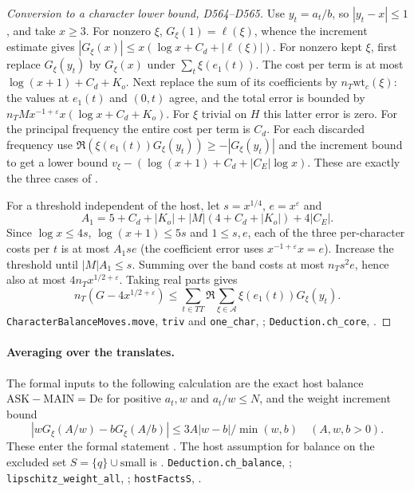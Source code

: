 \begin{proof}[Conversion to a character lower bound, D564--D565]
Use $y_t=a_t/b$, so $|y_t-x|\le1$, and take $x\ge3$.
For nonzero $\xi$, $G_\xi(1)=\ell(\xi)$, whence the increment estimate gives
$|G_\xi(x)|\le x(\log x+C_d+|\ell(\xi)|)$.
For nonzero kept $\xi$, first replace $G_\xi(y_t)$ by $G_\xi(x)$ under
$\sum_t\xi(e_1(t))$. The cost per term is at most
$\log(x+1)+C_d+K_o$. Next replace the sum of its coefficients by
$n_T\mathrm{wt}_c(\xi)$: the values at $e_1(t)$ and $(0,t)$ agree,
and the total error is bounded by
$n_T M x^{-1+\varepsilon}x(\log x+C_d+K_o)$.
For $\xi$ trivial on $H$ this latter error is zero. For the principal
frequency the entire cost per term is $C_d$. For each discarded frequency
use $\Re(\xi(e_1(t))G_\xi(y_t))\ge-|G_\xi(y_t)|$ and the increment
bound to get a lower bound $v_\xi-(\log(x+1)+C_d+|C_E|\log x)$.
These are exactly the three cases of .

For a threshold independent of the host, let $s=x^{1/4}$,
$e=x^\varepsilon$ and
\[
 A_1=5+C_d+|K_o|+|M|(4+C_d+|K_o|)+4|C_E|.
\]
Since $\log x\le4s$, $\log(x+1)\le5s$ and $1\le s,e$, each of the
three per-character costs per $t$ is at most $A_1 s e$ (the coefficient
error uses $x^{-1+\varepsilon}x=e$). Increase the threshold until
$|M|A_1\le s$. Summing over the band costs at most $n_Ts^2e$,
hence also at most $4n_Tx^{1/2+\varepsilon}$. Taking real parts gives
\[
 n_T(G-4x^{1/2+\varepsilon})
 \le \sum_{t\in TT}\Re\sum_{\xi\in\mathcal A}
                 \xi(e_1(t))G_\xi(y_t).
\]
\nolinkurl{CharacterBalanceMoves.move}, \nolinkurl{triv} and \nolinkurl{one_char},
;
\nolinkurl{Deduction.ch_core}, .
\end{proof}

\paragraph{Averaging over the translates.}
The formal inputs to the following calculation are the exact host
balance $\mathrm{ASK}-\mathrm{MAIN}=\mathrm{De}$ for positive
$a_t,w$ and $a_t/w\le N$, and the weight increment bound
\[
 |wG_\xi(A/w)-bG_\xi(A/b)|\le
   3A|w-b|/\min(w,b)\quad (A,w,b>0).
\]
These enter the formal statement . The host assumption for
balance on the excluded set $S=\{q\}\cup\mathrm{small}$ is .
\nolinkurl{Deduction.ch_balance}, ;
\nolinkurl{lipschitz_weight_all}, ;
\nolinkurl{hostFactsS}, .

